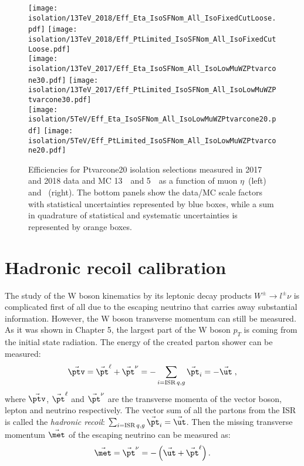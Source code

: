 	\begin{figure}[pt]
		\begin{center}
			\texttt{[image: isolation/13TeV\_2018/Eff\_Eta\_IsoSFNom\_All\_IsoFixedCutLoose.pdf]}
			\texttt{[image: isolation/13TeV\_2018/Eff\_PtLimited\_IsoSFNom\_All\_IsoFixedCutLoose.pdf]}\\
			\texttt{[image: isolation/13TeV\_2017/Eff\_Eta\_IsoSFNom\_All\_IsoLowMuWZPtvarcone30.pdf]}
			\texttt{[image: isolation/13TeV\_2017/Eff\_PtLimited\_IsoSFNom\_All\_IsoLowMuWZPtvarcone30.pdf]}\\
			\texttt{[image: isolation/5TeV/Eff\_Eta\_IsoSFNom\_All\_IsoLowMuWZPtvarcone20.pdf]}
			\texttt{[image: isolation/5TeV/Eff\_PtLimited\_IsoSFNom\_All\_IsoLowMuWZPtvarcone20.pdf]}
			\caption{Efficiencies for Ptvarcone20 isolation selections measured in 2017 and 2018 data and MC 13~\TeV\  and 5~\TeV\ as a function of muon $\eta$~(left) and \pt~(right). The bottom panels show the data/MC scale factors with statistical uncertainties represented by blue boxes, while a sum in quadrature of statistical and systematic uncertainties is represented by orange boxes.}
			\label{fig:iso-sf-13TeV-2018}
		\end{center}
	\end{figure}
	
	\clearpage

     \section{Hadronic recoil calibration}
     The study of the W boson kinematics by its leptonic decay products $W^{\pm}\rightarrow l^{\pm} \nu$ is complicated first of all due to the escaping neutrino that carries away substantial information. However, the W boson transverse momentum can still be measured. As it was shown in Chapter 5, the largest part of the W boson $p_T$ is coming from the initial state radiation. The energy of the created parton shower can be measured:
	\begin{equation}
	\vec{\ptv}=\vec{\pt}^{\ell}+\vec{\pt}^{\nu} = -\sum_{i=\mathrm{ISR}\, q,g} \vec{\pt}_i = -\vec{\ut}\;,
	\end{equation}
	where $\vec{\ptv}$, $\vec{\pt}^{\ell}$ and $\vec{\pt}^{\nu}$ are the transverse momenta of the vector boson, lepton and neutrino respectively. The vector sum of all the partons from the ISR is called the \textit{hadronic recoil}: $\sum_{i=\mathrm{ISR}\, q,g} \vec{\pt}_i = \vec{\ut}$. Then the missing transverse momentum $\vec{\met} $ of the escaping neutrino can be measured as:
	\begin{equation}\label{eq:METandNeutrino}
	\vec{\met} = \vec{\pt}^{\nu} = -\left(\vec{\ut}+\vec{\pt}^\ell\right).
	\end{equation}

